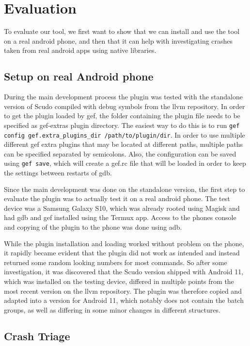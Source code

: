 \documentclass[a4paper,11pt,oneside]{report}
\begin{document}
\chapter{Evaluation}

To evaluate our tool, we first want to show that we can install and use the
tool on a real android phone, and then that it can help with investigating
crashes taken from real android apps using native libraries.

\section{Setup on real Android phone}

During the main development process the plugin was tested with the standalone
version of Scudo compiled with debug symbols from the llvm repository. In
order to get the plugin loaded by gef, the folder containing the plugin file
needs to be specified as gef-extras plugin directory. The easiest way to do this
is to run \verb|gef config gef.extra_plugins_dir /path/to/plugin/dir|. In order
to use multiple different gef extra plugins that may be located at different
paths, multiple paths can be specified separated by semicolons. Also, the
configuration can be saved using \verb|gef save|, which will create a gef.rc file
that will be loaded in order to keep the settings between restarts of gdb.

Since the main development was done on the standalone version, the first step
to evaluate the plugin was to actually test it on a real android phone. The
test device was a Samsung Galaxy S10, which was already rooted using Magisk
and had gdb and gef installed using the Termux app. Access to the phones
console and copying of the plugin to the phone was done using adb.

While the plugin installation and loading worked without problem on the phone, it
rapidly became evident that the plugin did not work as intended and instead
returned some random looking numbers for most commands. So after some
investigation, it was discovered that the Scudo version shipped with Android
11, which was installed on the testing device, differed in multiple points
from the most recent version on the llvm repository. The plugin was therefore
copied and adapted into a version for Android 11, which notably does not
contain the batch groups, as well as differing in some minor changes in
different structures.

\section{Crash Triage}
\end{document}
